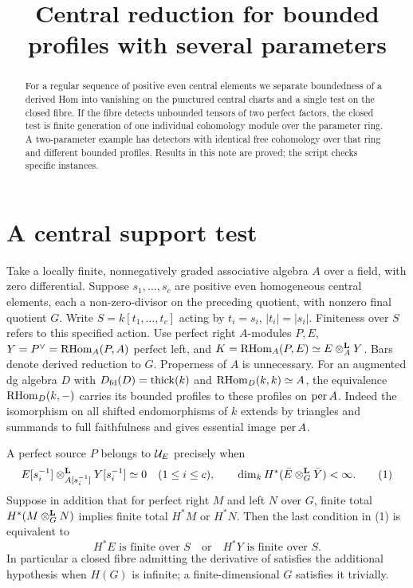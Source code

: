 \documentclass[11pt]{article}
\title{Central reduction for bounded profiles with several parameters}
\author{\workingauthor}\date{\coursedate}
\begin{document}
\maketitle
\begin{abstract}
For a regular sequence of positive even central elements we separate
boundedness of a derived Hom into vanishing on the punctured central
charts and a single test on the closed fibre. If the fibre detects
unbounded tensors of two perfect factors, the closed test is finite
generation of one individual cohomology module over the parameter ring.
A two-parameter example has detectors with identical free cohomology
over that ring and different bounded profiles. Results in this note
are proved; the script checks specific instances.
\end{abstract}

\section{A central support test}
Take a locally finite, nonnegatively graded associative algebra $A$
over a field, with zero differential. Suppose $s_1,\ldots,s_c$ are
positive even homogeneous central elements, each a non-zero-divisor
on the preceding quotient, with nonzero final quotient $G$.
Write $S=k[t_1,\ldots,t_c]$ acting by $t_i=s_i$, $|t_i|=|s_i|$.
Finiteness over $S$ refers to this specified action. Use perfect right
$A$-modules $P,E$, $Y=P^\vee=\operatorname{RHom}_A(P,A)$ perfect left, and
$K=\operatorname{RHom}_A(P,E)\simeq E\otimes^{\mathbf L}_A Y$. Bars denote derived reduction to $G$.
Properness of $A$ is unnecessary. For an augmented dg algebra $D$ with
$D_{\mathrm{fd}}(D)=\operatorname{thick}(k)$ and $\operatorname{RHom}_D(k,k)\simeq A$, the equivalence
$\operatorname{RHom}_D(k,-)$ carries its bounded profiles to these profiles on $\operatorname{per} A$.
Indeed the isomorphism on all shifted endomorphisms of $k$ extends by
triangles and summands to full faithfulness and gives essential image
$\operatorname{per} A$.

\begin{thm}\label{central}
A perfect source $P$ belongs to $\mathcal U_E$ precisely when
\[
 E[s_i^{-1}]\otimes^{\mathbf L}_{A[s_i^{-1}]}Y[s_i^{-1}]\simeq0
 \quad(1\le i\le c),\qquad
 \dim_k H^*(\bar E\otimes^{\mathbf L}_G\bar Y)<\infty.                 \tag{1}
\]
Suppose in addition that for perfect right $M$ and left $N$ over $G$,
finite total $H^*(M\otimes^{\mathbf L}_G N)$ implies finite total $H^*M$ or $H^*N$.
Then the last condition in (1) is equivalent to
\[
                    H^*E\text{ is finite over }S
          \quad\text{or}\quad H^*Y\text{ is finite over }S .       \tag{2}
\]
In particular a closed fibre admitting the derivative of
satisfies the additional hypothesis when $H(G)$ is infinite; a
finite-dimensional $G$ satisfies it trivially.
\end{thm}
\end{document}
